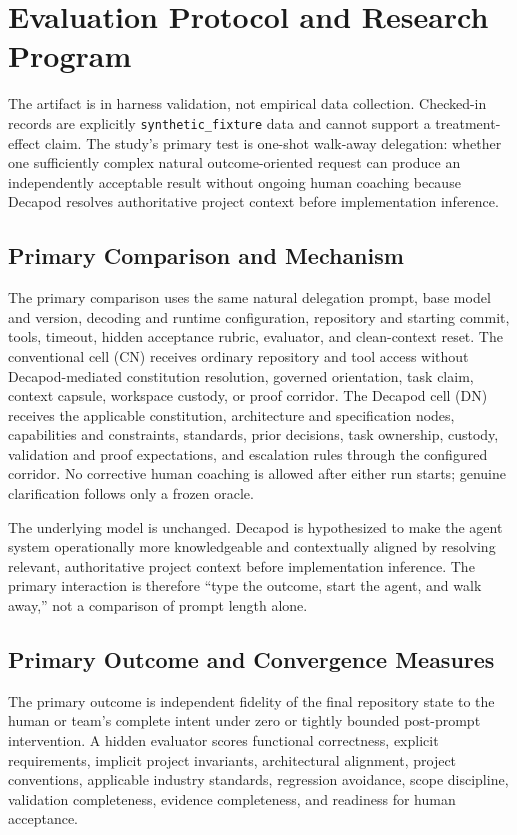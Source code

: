 \section{Evaluation Protocol and Research Program}
\label{sec:evaluation}

The artifact is in harness validation, not empirical data collection. Checked-in records are explicitly \texttt{synthetic\_fixture} data and cannot support a treatment-effect claim. The study's primary test is one-shot walk-away delegation: whether one sufficiently complex natural outcome-oriented request can produce an independently acceptable result without ongoing human coaching because Decapod resolves authoritative project context before implementation inference.

\subsection{Primary Comparison and Mechanism}

The primary comparison uses the same natural delegation prompt, base model and version, decoding and runtime configuration, repository and starting commit, tools, timeout, hidden acceptance rubric, evaluator, and clean-context reset. The conventional cell (CN) receives ordinary repository and tool access without Decapod-mediated constitution resolution, governed orientation, task claim, context capsule, workspace custody, or proof corridor. The Decapod cell (DN) receives the applicable constitution, architecture and specification nodes, capabilities and constraints, standards, prior decisions, task ownership, custody, validation and proof expectations, and escalation rules through the configured corridor. No corrective human coaching is allowed after either run starts; genuine clarification follows only a frozen oracle.

The underlying model is unchanged. Decapod is hypothesized to make the agent system operationally more knowledgeable and contextually aligned by resolving relevant, authoritative project context before implementation inference. The primary interaction is therefore ``type the outcome, start the agent, and walk away,'' not a comparison of prompt length alone.

\subsection{Primary Outcome and Convergence Measures}

The primary outcome is independent fidelity of the final repository state to the human or team's complete intent under zero or tightly bounded post-prompt intervention. A hidden evaluator scores functional correctness, explicit requirements, implicit project invariants, architectural alignment, project conventions, applicable industry standards, regression avoidance, scope discipline, validation completeness, evidence completeness, and readiness for human acceptance.


